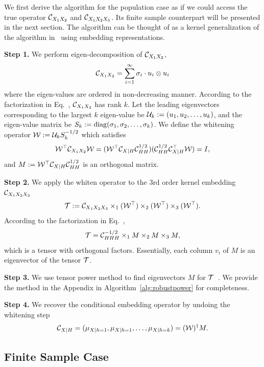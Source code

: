 \documentclass{article}
\begin{document}
We  first derive the algorithm for the population case as if we could access the true operator $\mathcal{C}_{X_1 X_2}$ and $\mathcal{C}_{X_1 X_2 X_3}$. Its finite sample counterpart  will be presented in the next section. The algorithm can be thought of as a kernel generalization of the algorithm in~\citet{AnandkumarEtal:community12} using embedding representations.

{\bf Step 1.} We perform eigen-decomposition of $\mathcal{C}_{X_1 X_2}$,
$$\mathcal{C}_{X_1 X_2} = \sum_{i=1}^{\infty} \sigma_i \cdot u_i \otimes u_i$$
where the eigen-values are ordered in non-decreasing manner.
According to the factorization in Eq.~, $\mathcal{C}_{X_1 X_2}$ has rank $k$.
Let the leading eigenvectors corresponding to the largest $k$ eigen-value be  $\mathcal{U}_k:=(u_1,u_2,\ldots,u_k)$, and the eigen-value matrix be $S_k:=\mathop{\mathrm{diag}}(\sigma_1,\sigma_2,\ldots,\sigma_k)$. We define the whitening operator $\mathcal{W}:= \mathcal{U}_k S_k^{-1/2}$ which satisfies
\begin{align*}
  \mathcal{W}^\top \mathcal{C}_{X_1X_2} \mathcal{W} = (\mathcal{W}^\top \mathcal{C}_{X|H} \mathcal{C}_{HH}^{1/2}) (\mathcal{C}_{HH}^{1/2} \mathcal{C}_{X|H}^\top \mathcal{W}) = I,
\end{align*}
and $M:=\mathcal{W}^\top \mathcal{C}_{X|H} \mathcal{C}_{HH}^{1/2}$ is an orthogonal matrix.

{\bf Step 2.} We apply the whiten operator to the 3rd order kernel embedding $\mathcal{C}_{X_1 X_2 X_3}$
$$
  {\mathcal{T}} := \mathcal{C}_{X_1 X_2 X_3} \times_1 (\mathcal{W}^\top) \times_2 (\mathcal{W}^\top) \times_3 (\mathcal{W}^\top).
$$
According to the factorization in Eq.~,
$$
  {\mathcal{T}} = \mathcal{C}_{HHH}^{-1/2} \times_1 M \times_2 M \times_3 M,
$$
which is a tensor with orthogonal factors. Essentially, each column $v_i$ of $M$ is an eigenvector of the tensor ${\mathcal{T}}$.

{\bf Step 3.} We use tensor power method to find eigenvectors $M$ for ${\mathcal{T}}$~\cite{AnandkumarEtal:community12}. We provide the method in the Appendix in Algorithm~\ref{alg:robustpower} for completeness.

{\bf Step 4.} We recover the conditional embedding operator by undoing the whitening step
$$
  \mathcal{C}_{X|H} = (\mu_{X|h=1},\mu_{X|h=1},\ldots,\mu_{X|h=k}) = (\mathcal{W})^\dagger M.
$$

\vspace{-3mm}
\subsection{Finite Sample Case}\label{sec:sample}
\vspace{-3mm}
\end{document}
